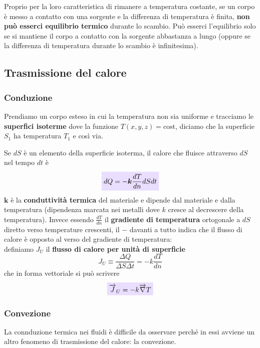 \documentclass[x11names]{article}
\newcommand{\viola}[1]{\colorbox{myred}{$\displaystyle #1$}}
\begin{document}
	\noindent
	Proprio per la loro caratteristica di rimanere a temperatura costante, se un corpo è messo a contatto con una sorgente e la differenza di temperatura è finita, \textbf{non può esserci equilibrio termico} durante lo scambio. Può esserci l'equilibrio solo se si mantiene il corpo a contatto con la sorgente abbastanza a lungo (oppure se la differenza di temperatura durante lo scambio è infinitesima).
	
	
	\subsection{Trasmissione del calore}
	
	\subsubsection{Conduzione}
	Prendiamo un corpo esteso in cui la temperatura non sia uniforme e tracciamo le \textbf{superfici isoterme} dove la funzione \(T(x,y,z) = \text{cost}\), diciamo che la superficie \(S_1\) ha temperatura \(T_1\) e così via. 
	
	Se \(dS\) è un elemento della superficie isoterma, il calore che fluisce attraverso \(dS\) nel tempo \(dt\) è 
	\begin{equation}\label{fourier calore}
		\viola{dQ = -\boldsymbol{k} \frac{dT}{dn}dS dt}
	\end{equation}
	\(\boldsymbol{k}\) è la \textbf{conduttività termica} del materiale e dipende dal materiale e dalla temperatura (dipendenza marcata nei metalli dove \(k\) cresce al decrescere della temperatura). Invece essendo \(\frac{dT}{dn}\) il \textbf{gradiente di temperatura} ortogonale a \(dS\) diretto verso temperature crescenti, il \(\boldsymbol{-}\) davanti a tutto indica che il flusso di calore è opposto al verso del gradiente di temperatura:\\
	
	\noindent
	definiamo \(J_U\) il \textbf{flusso di calore per unità di superficie} 
	\[ 
	J_U \equiv \frac{\Delta Q}{\Delta S \Delta t} = - k \frac{dT}{dn}
	\]
	che in forma vettoriale si può scrivere
	\begin{equation}
		\viola{\overrightarrow{J}_U = -k \overrightarrow{\nabla}T}
	\end{equation}
	
	\subsubsection{Convezione}
	La connduzione termica nei fluidi è difficile da osservare perché in essi avviene un altro fenomeno di trasmissione del calore: la convezione.
	
\end{document}
